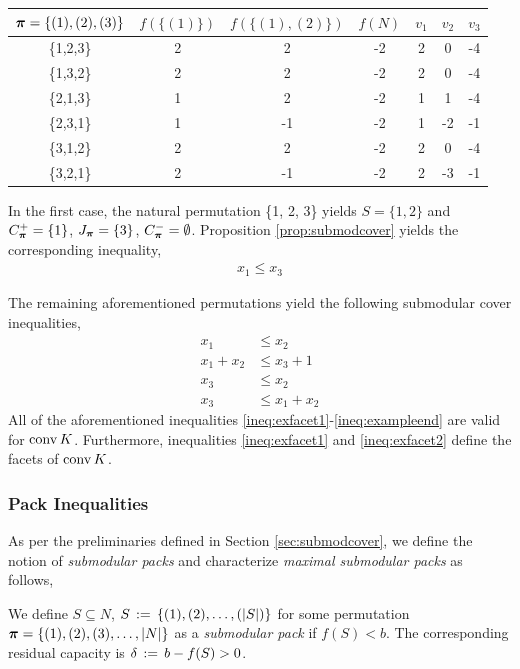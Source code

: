 \documentclass[10pt,twoside]{amsart}
\begin{document}
\begin{example}
\begin{table}[htbp]
\begin{tabular}{c|ccc|ccc}
    \toprule
    $\boldsymbol\pi = \{(1),(2),(3)\}$ & $f(\{(1)\})$ & $f(\{(1),(2)\})$ & $f(N)$ & $v_1$   & $v_2$   & $v_3$ \\
    \midrule
    \{1,2,3\} & 2     & 2     & -2    & 2     & 0     & -4 \\
    \{1,3,2\} & 2     & 2     & -2    & 2     & 0     & -4 \\
    \{2,1,3\} & 1     & 2     & -2    & 1     & 1     & -4 \\
    \{2,3,1\} & 1     & -1    & -2    & 1     & -2    & -1 \\
    \{3,1,2\} & 2     & 2     & -2    & 2     & 0     & -4 \\
    \{3,2,1\} & 2     & -1    & -2    & 2     & -3    & -1 \\
    \bottomrule
    \end{tabular}%
  \label{tab:example}%
\end{table}%
In the first case, the natural permutation \{1, 2, 3\} yields $S = \{1,2\}$ and $C^+_{\boldsymbol\pi} = \{1\}$, $J_{\boldsymbol\pi} = \{3\}$, $C^-_{\boldsymbol\pi} = \emptyset$. Proposition \ref{prop:submodcover} yields the corresponding inequality,
\begin{align}
    x_1 \leq x_3 \label{ineq:exfacet1}
\end{align}

The remaining aforementioned permutations yield the following submodular cover inequalities,
\begin{align}
    x_1 &\leq x_2 \\
    x_1 + x_2 &\leq x_3 + 1 \\
    x_3 &\leq x_2 \label{ineq:exfacet2}\\
    x_3 &\leq x_1 + x_2\label{ineq:exampleend}
\end{align}
All of the aforementioned inequalities \eqref{ineq:exfacet1}-\eqref{ineq:exampleend} are valid for $\operatorname{conv}{K}$. Furthermore, inequalities \eqref{ineq:exfacet1} and \eqref{ineq:exfacet2} define the facets of $\operatorname{conv}{K}$.
\end{example}

\subsubsection{Pack Inequalities}
\label{sec:submodpack}
\hfill

 As per the preliminaries defined in Section \ref{sec:submodcover}, we define the notion of \textit{submodular packs} and characterize \textit{maximal submodular packs} as follows,
\begin{dfn}
  We define $S\subseteq N$, $S \,:=\, \{(1), (2), \ldots, (|S|)\}$ for some permutation $\boldsymbol\pi = \{(1), (2), (3),\ldots, |N|\}$ as a \emph{submodular pack} if $f(S) < b$. The corresponding residual capacity is $\delta \,:=\, b - f(S) > 0$.
\end{dfn}
\end{document}

